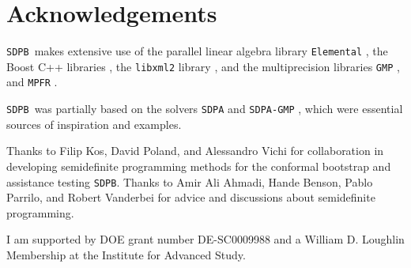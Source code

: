 \documentclass[12pt]{article}
\numberwithin{equation}{section}
\newcommand\SDPB{\texttt{SDPB}}
\begin{document}
\section{Acknowledgements}

\SDPB\ makes extensive use of the parallel linear algebra library
\texttt{Elemental} \cite{Elemental}, the Boost C++
libraries \cite{BoostSite}, the \texttt{libxml2} library
\cite{libxml2}, and the multiprecision libraries \texttt{GMP}
\cite{GMP}, and \texttt{MPFR}
\cite{MPFR}.

\SDPB\ was partially based on the solvers \texttt{SDPA} and
\texttt{SDPA-GMP} \cite{SDPA,SDPA2,SDPAGMP}, which were essential
sources of inspiration and examples.

Thanks to Filip Kos, David Poland, and Alessandro Vichi for collaboration in developing semidefinite programming methods for the conformal bootstrap and assistance testing \SDPB.  Thanks to Amir Ali Ahmadi, Hande Benson, Pablo Parrilo, and Robert Vanderbei for advice and discussions about semidefinite programming.

I am supported by DOE grant number DE-SC0009988 and a William D. Loughlin Membership at the Institute for Advanced Study.
\end{document}
